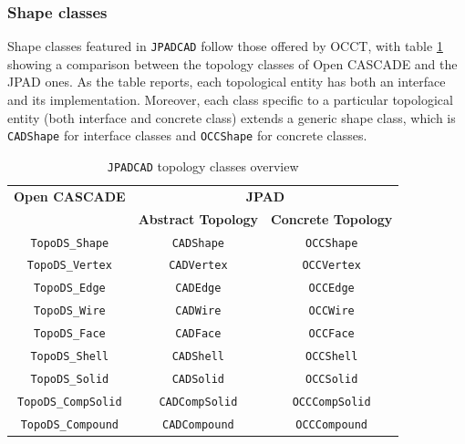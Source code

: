 \subsubsection{Shape classes}

Shape classes featured in \lstinline[language=Java]!JPADCAD! follow those offered by \gls{OCCT}, with table \ref{tab:JPADCADTopEnt} showing a comparison between the topology classes of Open CASCADE and the \gls{JPAD} ones. As the table reports, each topological entity has both an interface and its implementation. Moreover, each class specific to a particular topological entity (both interface and concrete class) extends a generic shape class, which is \lstinline[language=Java]!CADShape! for interface classes and \lstinline[language=Java]!OCCShape! for concrete classes. 
%
\bigskip
\begin{table}[H]
\centering
\begin{tabular}{ccc}
\toprule
\textbf{Open CASCADE} & \multicolumn{2}{c}{\textbf{JPAD}} \\
& \textbf{Abstract Topology} & \textbf{Concrete Topology} \\
\midrule
\lstinline[language=Java]!TopoDS_Shape! & \lstinline[language=Java]!CADShape! & \lstinline[language=Java]!OCCShape! \\
\lstinline[language=Java]!TopoDS_Vertex! & \lstinline[language=Java]!CADVertex! & \lstinline[language=Java]!OCCVertex! \\
\lstinline[language=Java]!TopoDS_Edge! & \lstinline[language=Java]!CADEdge! & \lstinline[language=Java]!OCCEdge! \\
\lstinline[language=Java]!TopoDS_Wire! & \lstinline[language=Java]!CADWire! & \lstinline[language=Java]!OCCWire! \\
\lstinline[language=Java]!TopoDS_Face! & \lstinline[language=Java]!CADFace! & \lstinline[language=Java]!OCCFace! \\
\lstinline[language=Java]!TopoDS_Shell! & \lstinline[language=Java]!CADShell! & \lstinline[language=Java]!OCCShell! \\
\lstinline[language=Java]!TopoDS_Solid! & \lstinline[language=Java]!CADSolid! & \lstinline[language=Java]!OCCSolid! \\
\lstinline[language=Java]!TopoDS_CompSolid! & \lstinline[language=Java]!CADCompSolid! & \lstinline[language=Java]!OCCCompSolid! \\
\lstinline[language=Java]!TopoDS_Compound! & \lstinline[language=Java]!CADCompound! & \lstinline[language=Java]!OCCCompound! \\
\bottomrule
\end{tabular}
\caption{\lstinline[language=Java]!JPADCAD! topology classes overview}
\label{tab:JPADCADTopEnt}
\end{table}

